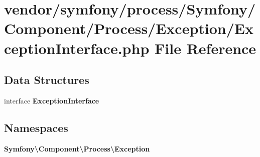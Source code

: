 \section{vendor/symfony/process/\+Symfony/\+Component/\+Process/\+Exception/\+Exception\+Interface.php File Reference}
\label{symfony_2process_2_symfony_2_component_2_process_2_exception_2_exception_interface_8php}
\subsection*{Data Structures}
\begin{DoxyCompactItemize}
\item 
interface {\bf Exception\+Interface}
\end{DoxyCompactItemize}
\subsection*{Namespaces}
\begin{DoxyCompactItemize}
\item 
 {\bf Symfony\textbackslash{}\+Component\textbackslash{}\+Process\textbackslash{}\+Exception}
\end{DoxyCompactItemize}
